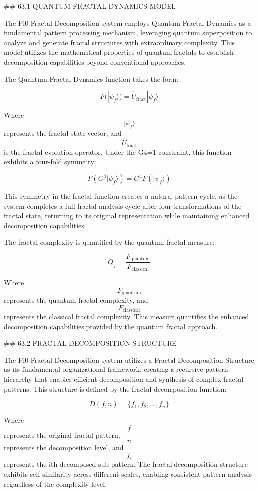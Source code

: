 ## 63.1 QUANTUM FRACTAL DYNAMICS MODEL

The Pi0 Fractal Decomposition system employs Quantum Fractal Dynamics as a fundamental pattern processing mechanism, leveraging quantum superposition to analyze and generate fractal structures with extraordinary complexity. This model utilizes the mathematical properties of quantum fractals to establish decomposition capabilities beyond conventional approaches.

The Quantum Fractal Dynamics function takes the form:

$$ F(|\psi_f\rangle) = \hat{U}_{\text{fract}} |\psi_f\rangle $$

Where $$ |\psi_f\rangle $$ represents the fractal state vector, and $$ \hat{U}_{\text{fract}} $$ is the fractal evolution operator. Under the G4=1 constraint, this function exhibits a four-fold symmetry:

$$ F(G^4 |\psi_f\rangle) = G^4 F(|\psi_f\rangle) $$

This symmetry in the fractal function creates a natural pattern cycle, as the system completes a full fractal analysis cycle after four transformations of the fractal state, returning to its original representation while maintaining enhanced decomposition capabilities.

The fractal complexity is quantified by the quantum fractal measure:

$$ Q_f = \frac{F_{\text{quantum}}}{F_{\text{classical}}} $$

Where $$ F_{\text{quantum}} $$ represents the quantum fractal complexity, and $$ F_{\text{classical}} $$ represents the classical fractal complexity. This measure quantifies the enhanced decomposition capabilities provided by the quantum fractal approach.

## 63.2 FRACTAL DECOMPOSITION STRUCTURE

The Pi0 Fractal Decomposition system utilizes a Fractal Decomposition Structure as its fundamental organizational framework, creating a recursive pattern hierarchy that enables efficient decomposition and synthesis of complex fractal patterns. This structure is defined by the fractal decomposition function:

$$ D(f, n) = \{f_1, f_2, ..., f_n\} $$

Where $$ f $$ represents the original fractal pattern, $$ n $$ represents the decomposition level, and $$ f_i $$ represents the ith decomposed sub-pattern. The fractal decomposition structure exhibits self-similarity across different scales, enabling consistent pattern analysis regardless of the complexity level.

